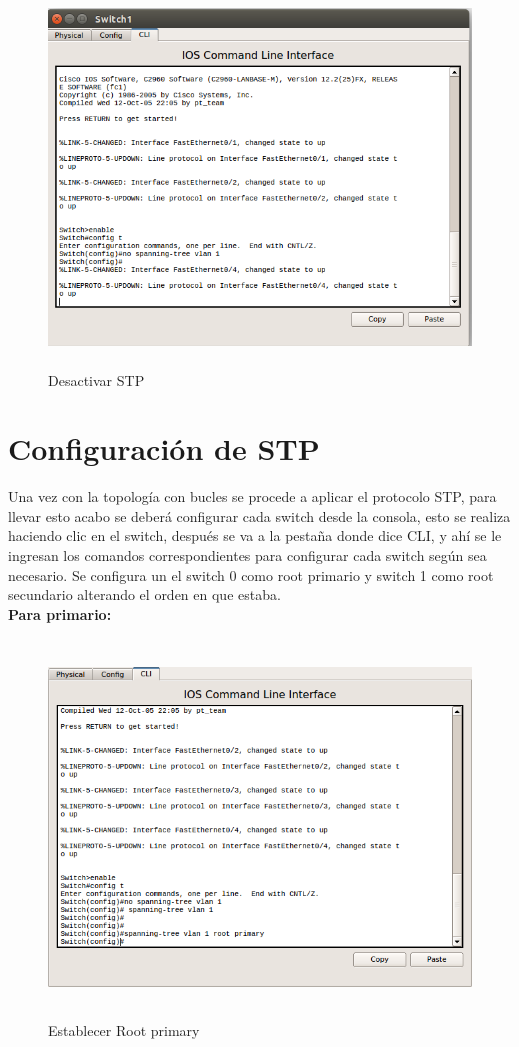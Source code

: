 \documentclass{udpreport}
\begin{document}
    \begin{figure}[h]
    \centering
    \includegraphics[width=12cm, height=10cm]{1.png}
    \caption{Desactivar STP}
    \end{figure}
    \newpage
	\section{Configuración de STP}
	Una vez con la topología con bucles se procede a aplicar el protocolo STP, para llevar esto acabo se deberá configurar cada
	switch desde la consola, esto se realiza haciendo clic en el switch, después se va a la pestaña donde dice CLI, y ahí se le
	ingresan los comandos correspondientes para configurar cada switch según sea necesario. Se configura un el switch 0 como root primario y switch 1 como root secundario alterando el orden en que estaba.\\
	{\large \bf{Para primario: }}\\
	
	\begin{figure}[h]
    \centering
    \includegraphics[width=12cm, height=10cm]{3.png}
    \caption{Establecer Root primary}
    \end{figure}
    \newpage
	
\end{document}
